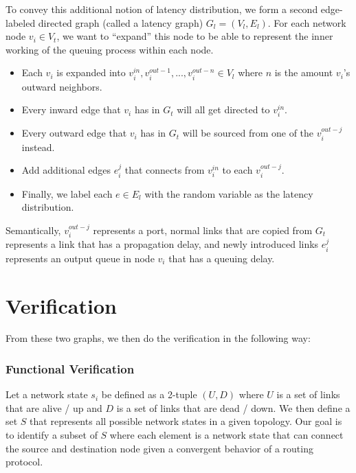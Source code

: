 \documentclass[10pt,sigconf,letterpaper,anonymous,nonacm]{acmart}
\begin{document}
To convey this additional notion of latency distribution, we form a second edge-labeled directed 
graph (called a latency graph) $G_l = (V_l, E_l)$.
For each network node $v_i \in V_t$, we want to ``expand'' this node to be able to represent the 
inner working of the queuing process within each node. 

\begin{itemize}
    \item Each $v_i$ is expanded into $v_i^{in}, v_i^{out-1}, ..., v_i^{out-n} \in V_l$ 
    where $n$ is the amount $v_i$'s outward neighbors. 

    \item Every inward edge that $v_i$ has in $G_t$ will all get directed to $v_i^{in}$.

    \item Every outward edge that $v_i$ has in $G_t$ will be sourced from one of the 
    $v_i^{out-j}$ instead.
    
    \item Add additional edges $e_i^j$ that connects from $v_i^{in}$ to each $v_i^{out-j}$.

    \item Finally, we label each $e \in E_l$ with the random variable as the latency distribution.
\end{itemize}

Semantically, $v_i^{out-j}$ represents a port, normal links that are copied from $G_t$ represents 
a link that has a propagation delay, and newly introduced links $e_i^j$ represents an output queue 
in node $v_i$ that has a queuing delay.


\section{Verification}
From these two graphs, we then do the verification in the following way:

\subsubsection{Functional Verification}
Let a network state $s_i$ be defined as a 2-tuple $(U, D)$ where $U$ is a set of links that are 
alive / up and $D$ is a set of links that are dead / down.
We then define a set $S$ that represents all possible network states in a given topology. 
Our goal is to identify a subset of $S$ where each element is a network state that can connect 
the source and destination node given a convergent behavior of a routing protocol.
\end{document}
